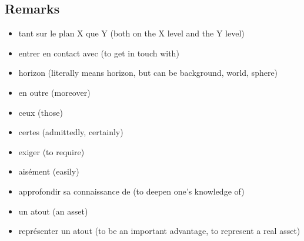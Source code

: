 \documentclass{book}
\begin{document}
    \subsection{Remarks}
        \begin{itemize}
            \item tant sur le plan X que Y (both on the X level and the Y level)
            \item entrer en contact avec (to get in touch with)
            \item horizon (literally means horizon, but can be background, world, sphere)
            \item en outre (moreover)
            \item ceux (those)
            \item certes (admittedly, certainly)
            \item exiger (to require)
            \item aisément (easily)
            \item approfondir sa connaissance de (to deepen one's knowledge of)
            \item un atout (an asset)
            \item représenter un atout (to be an important advantage, to represent a real asset)
        \end{itemize}
    
\end{document}
